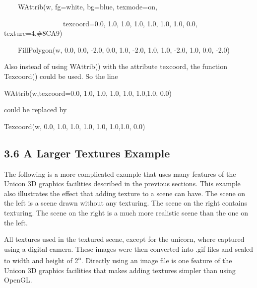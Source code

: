 \documentclass[letterpaper]{article}
\begin{document}
{\bigskip


\bigskip

{\sffamily
\ \ \ \ WAttrib(w, {\textquotedbl}fg=white{\textquotedbl}, {\textquotedbl}bg=blue{\textquotedbl},
{\textquotedbl}texmode=on{\textquotedbl},}

{\sffamily
\ \ \ \ \ \ \ \ \ \ \ \ \ \ \ \ \ {\textquotedbl}texcoord=0.0, 1.0, 1.0, 1.0, 1.0, 1.0, 1.0, 0.0{\textquotedbl},
{\textquotedbl}texture=4,\#8CA9{\textquotedbl})}

{\sffamily
\ \ \ \ FillPolygon(w, 0.0, 0.0, -2.0, 0.0, 1.0, -2.0, 1.0, 1.0, -2.0, 1.0, 0.0, -2.0) }


\bigskip

Also instead of using \textsf{WAttrib()} with the attribute
\textsf{texcoord}, the function \textsf{Texcoord()} could be
used. So the line

\bigskip

{\sffamily
WAttrib(w,{\textquotedbl}texcoord=0.0, 1.0, 1.0, 1.0, 1.0, 1.0,1.0, 0.0{\textquotedbl})}


\bigskip

\noindent could be replaced by


\bigskip

{\sffamily
Texcoord(w, 0.0, 1.0, 1.0, 1.0, 1.0, 1.0,1.0, 0.0)\newline
}

\subsection[3.6 A Larger Textures Example]{3.6 A Larger Textures Example}

The following is a more complicated example that uses many features of
the Unicon 3D graphics facilities described in the previous
sections. This example also illustrates the effect that adding texture
to a scene can have. The scene on the left is a scene drawn without
any texturing. The scene on the right contains texturing. The scene on
the right is a much more realistic scene than the one on the left.

All textures used in the textured scene, except for the unicorn, where
captured using a digital camera. These images were then converted into
.gif files and scaled to width and height of 2\textsuperscript{n}.
Directly using an image file is one feature of the Unicon 3D graphics
facilities that makes adding textures simpler than using OpenGL.


}
\end{document}
